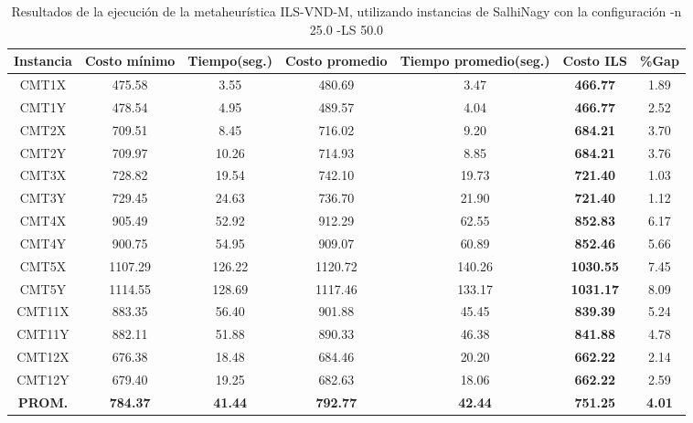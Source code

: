 \begin{table}[h]
\caption{Resultados de la ejecución de la metaheurística ILS-VND-M, utilizando instancias de SalhiNagy con la configuración -n 25.0 -LS 50.0}
\centering
\small
\begin{tabular}{c c c c c c c}
\hline\hline
Instancia & Costo mínimo & Tiempo(seg.) & Costo promedio & Tiempo promedio(seg.) & Costo ILS & \%Gap \\ [0.5ex]
\hline
CMT1X & 475.58 & 3.55 & 
480.69 & 3.47 & \bf{466.77} & 
1.89\\CMT1Y & 478.54 & 4.95 & 
489.57 & 4.04 & \bf{466.77} & 
2.52\\CMT2X & 709.51 & 8.45 & 
716.02 & 9.20 & \bf{684.21} & 
3.70\\CMT2Y & 709.97 & 10.26 & 
714.93 & 8.85 & \bf{684.21} & 
3.76\\CMT3X & 728.82 & 19.54 & 
742.10 & 19.73 & \bf{721.40} & 
1.03\\CMT3Y & 729.45 & 24.63 & 
736.70 & 21.90 & \bf{721.40} & 
1.12\\CMT4X & 905.49 & 52.92 & 
912.29 & 62.55 & \bf{852.83} & 
6.17\\CMT4Y & 900.75 & 54.95 & 
909.07 & 60.89 & \bf{852.46} & 
5.66\\CMT5X & 1107.29 & 126.22 & 
1120.72 & 140.26 & \bf{1030.55} & 
7.45\\CMT5Y & 1114.55 & 128.69 & 
1117.46 & 133.17 & \bf{1031.17} & 
8.09\\CMT11X & 883.35 & 56.40 & 
901.88 & 45.45 & \bf{839.39} & 
5.24\\CMT11Y & 882.11 & 51.88 & 
890.33 & 46.38 & \bf{841.88} & 
4.78\\CMT12X & 676.38 & 18.48 & 
684.46 & 20.20 & \bf{662.22} & 
2.14\\CMT12Y & 679.40 & 19.25 & 
682.63 & 18.06 & \bf{662.22} & 
2.59\\\bf{PROM.} & 
\bf{784.37} & \bf{41.44} & \bf{792.77} & \bf{42.44} & \bf{751.25} & \bf{4.01}\\[1ex]\hline
\end{tabular}
\label{table:ILS-VND-M-15-50-S}
\end{table}

